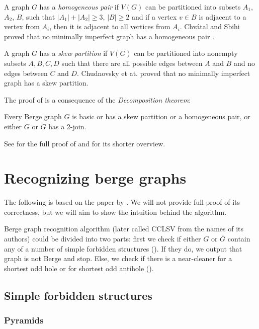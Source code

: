 A graph $G$ has a \emph{homogeneous pair} if $V(G)$ can be partitioned into subsets $A_1$, $A_2$, $B$, such that $|A_1|+|A_2| \geq 3$, $|B| \geq 2$ and if a vertex $v \in B$ is adjacent to a vertex from $A_i$, then it is adjacent to all vertices from $A_i$. Chvátal and Sbihi proved that no minimally imperfect graph has a homogeneous pair \cite{Chvtal1987}.

A graph $G$ has a \emph{skew partition} if $V(G)$ can be partitioned into nonempty subsets $A, B, C, D$ such that there are all possible edges between $A$ and $B$ and no edges between $C$ and $D$. Chudnovsky et at. proved that no minimally imperfect graph has a skew partition.

The proof of  is a consequence of the \emph{Decomposition theorem}:
\begin{theorem}
	\label{thm:decomposition}
	Every Berge graph $G$ is basic or has a skew partition or a homogeneous pair, or either $G$ or $\overline{G}$ has a 2-join.
\end{theorem}

See \cite{MC06} for the full proof of  and \cite{GC03} for its shorter overview.

\section{Recognizing berge graphs}
\label{sec:recognizingBerge}

The following is based on the paper by \citeauthor{MC05}  \cite{MC05}. We will not provide full proof of its correctness, but we will aim to show the intuition behind the algorithm.

Berge graph recognition algorithm (later called CCLSV from the names of its authors) could be divided into two parts: first we check if either $G$ or $\overline{G}$ contain any of a number of simple forbidden structures (). If they do, we output that graph is not Berge and stop. Else, we check if there is a near-cleaner for a shortest odd hole or for shortest odd antihole ().

\subsection{Simple forbidden structures}
\label{SimpleStructures}

\subsubsection{Pyramids}



